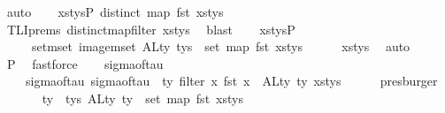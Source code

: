 \begin{isabellebody}
\ auto\isanewline
\ \ \isamarkupfalse%
\ xs{\isacharunderscore}{\kern0pt}tys{\isacharunderscore}{\kern0pt}P{}{\isacharcolon}{\kern0pt}\ {\isachardoublequoteopen}distinct\ {\isacharparenleft}{\kern0pt}map\ fst\ xs{\isacharunderscore}{\kern0pt}tys{\isacharparenright}{\kern0pt}{\isachardoublequoteclose}\isanewline
\ \ \ \ \isamarkupfalse%
\ TLI{\isachardot}{\kern0pt}prems{\isacharparenleft}{\kern0pt}{}{\isacharparenright}{\kern0pt}\ distinct{\isacharunderscore}{\kern0pt}map{\isacharunderscore}{\kern0pt}filter\ xs{\isacharunderscore}{\kern0pt}tys\ \isamarkupfalse%
\ blast\isanewline
\ \ \isamarkupfalse%
\ xs{\isacharunderscore}{\kern0pt}tys{\isacharunderscore}{\kern0pt}P{}{\isacharcolon}{\kern0pt}\isanewline
\ \ \ \ {\isachardoublequoteopen}{\isasymUnion}\ {\isacharparenleft}{\kern0pt}set{\isacharunderscore}{\kern0pt}mset\ {\isacharparenleft}{\kern0pt}image{\isacharunderscore}{\kern0pt}mset\ ALty\ tys{\isacharparenright}{\kern0pt}{\isacharparenright}{\kern0pt}\ {\isacharequal}{\kern0pt}\ set\ {\isacharparenleft}{\kern0pt}map\ fst\ xs{\isacharunderscore}{\kern0pt}tys{\isacharparenright}{\kern0pt}{\isachardoublequoteclose}\isanewline
\ \ \ \ \isamarkupfalse%
\ xs{\isacharunderscore}{\kern0pt}tys\ \isamarkupfalse%
\ auto\isanewline
\ \ \ \ \isamarkupfalse%
\ P{}\ \isamarkupfalse%
\ fastforce\isanewline
\isanewline
\ \ \isamarkupfalse%
\ sigma{\isacharunderscore}{\kern0pt}of{\isacharunderscore}{\kern0pt}tau\ \isanewline
\ \ \ \ sigma{\isacharunderscore}{\kern0pt}of{\isacharunderscore}{\kern0pt}tau{\isacharcolon}{\kern0pt}\ {\isachardoublequoteopen}sigma{\isacharunderscore}{\kern0pt}of{\isacharunderscore}{\kern0pt}tau\ {\isacharequal}{\kern0pt}\ {\isacharparenleft}{\kern0pt}{\isasymlambda}ty{\isachardot}{\kern0pt}\ filter\ {\isacharparenleft}{\kern0pt}{\isasymlambda}x{\isachardot}{\kern0pt}\ fst\ x\ {\isasymin}\ ALty\ ty{\isacharparenright}{\kern0pt}\ xs{\isacharunderscore}{\kern0pt}tys{\isacharparenright}{\kern0pt}{\isachardoublequoteclose}\isanewline
\ \ \ \ \isamarkupfalse%
\ presburger\isanewline
\isanewline
\ \ \isamarkupfalse%
\isanewline
\ \ \ \ {\isachardoublequoteopen}{\isasymforall}ty\ {\isasymin}{\isacharhash}{\kern0pt}\ tys{\isachardot}{\kern0pt}\ ALty\ ty\ {\isasymsubseteq}\ set\ {\isacharparenleft}{\kern0pt}map\ fst\ xs{\isacharunderscore}{\kern0pt}tys{\isacharparenright}{\kern0pt}{\isachardoublequoteclose}\isanewline

\end{isabellebody}
